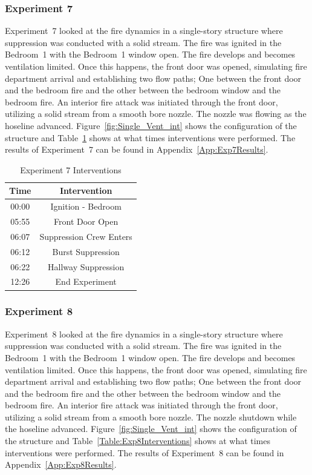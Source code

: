 \documentclass[12pt,oneside]{book}
\begin{document}
\FloatBarrier

\subsubsection{Experiment 7}
Experiment~7 looked at the fire dynamics in a single-story structure where suppression was conducted with a solid stream. The fire was ignited in the Bedroom~1 with the Bedroom~1 window open. The fire develops and becomes ventilation limited. Once this happens, the front door was opened, simulating fire department arrival and establishing two flow paths; One between the front door and the bedroom fire and the other between the bedroom window and the bedroom fire. An interior fire attack was initiated through the front door, utilizing a solid stream from a smooth bore nozzle. The nozzle was flowing as the hoseline advanced. Figure~\ref{fig:Single_Vent_int} shows the configuration of the structure and Table~\ref{Table:Exp7Interventions} shows at what times interventions were performed. The results of Experiment~7 can be found in Appendix~\ref{App:Exp7Results}. 


\begin{table}[H]
	\centering
	\caption{Experiment 7 Interventions}
	\begin{tabular}{|c|c|} 
		\hline
		Time & Intervention \\ \hline \hline
		00:00 & Ignition - Bedroom \\ \hline
		05:55 & Front Door Open \\ \hline
		06:07 & Suppression Crew Enters\\ \hline
		06:12 & Burst Suppression \\ \hline 
		06:22 & Hallway Suppression \\ \hline
		12:26 & End Experiment\\ \hline
	\end{tabular}
	\label{Table:Exp7Interventions}
\end{table}

\FloatBarrier

\subsubsection{Experiment 8}
Experiment~8 looked at the fire dynamics in a single-story structure where suppression was conducted with a solid stream. The fire was ignited in the Bedroom~1 with the Bedroom~1 window open. The fire develops and becomes ventilation limited. Once this happens, the front door was opened, simulating fire department arrival and establishing two flow paths; One between the front door and the bedroom fire and the other between the bedroom window and the bedroom fire. An interior fire attack was initiated through the front door, utilizing a solid stream from a smooth bore nozzle. The nozzle shutdown while the hoseline advanced. Figure~\ref{fig:Single_Vent_int} shows the configuration of the structure and Table~\ref{Table:Exp8Interventions} shows at what times interventions were performed. The results of Experiment~8 can be found in Appendix~\ref{App:Exp8Results}. 
\end{document}
